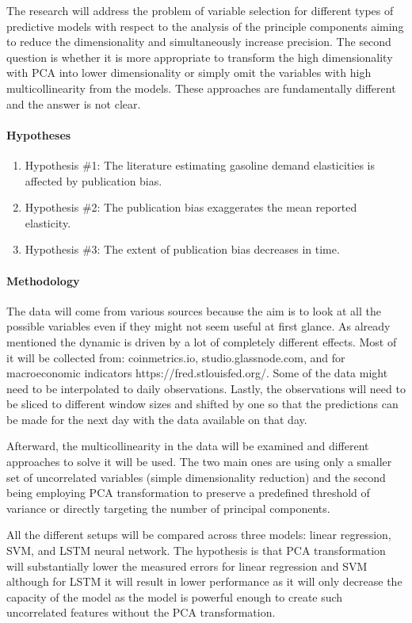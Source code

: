 The research will address the problem of variable selection for different types of predictive models with respect to the
analysis of the principle components aiming to reduce the dimensionality and simultaneously increase precision. The second
question is whether it is more appropriate to transform the high dimensionality with PCA into lower dimensionality or
simply omit the variables with high multicollinearity from the models. These approaches are fundamentally different and the
answer is not clear.

\paragraph{Hypotheses}
\begin{enumerate}
	\item[] Hypothesis \#1: The literature estimating gasoline demand elasticities is affected by publication bias.
	\item[] Hypothesis \#2: The publication bias exaggerates the mean reported elasticity.
	\item[] Hypothesis \#3: The extent of publication bias decreases in time.
\end{enumerate}

\paragraph{Methodology}

The data will come from various sources because the aim is to look at all the possible variables even if they might not seem
useful at first glance. As already mentioned the dynamic is driven by a lot of completely different effects. Most of it will be
collected from: coinmetrics.io, studio.glassnode.com, and for macroeconomic indicators https://fred.stlouisfed.org/. Some of
the data might need to be interpolated to daily observations. Lastly, the observations will need to be sliced to different
window sizes and shifted by one so that the predictions can be made for the next day with the data available on that day.

Afterward, the multicollinearity in the data will be examined and different approaches to solve it will be used. The two main
ones are using only a smaller set of uncorrelated variables (simple dimensionality reduction) and the second being employing
PCA transformation to preserve a predefined threshold of variance or directly targeting the number of principal components.

All the different setups will be compared across three models: linear regression, SVM, and LSTM neural network. The
hypothesis is that PCA transformation will substantially lower the measured errors for linear regression and SVM although
for LSTM it will result in lower performance as it will only decrease the capacity of the model as the model is powerful
enough to create such uncorrelated features without the PCA transformation.

